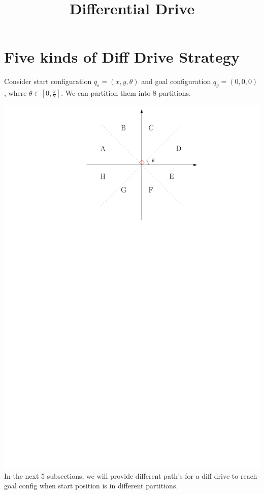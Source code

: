 \documentclass[12pt]{article}
\title{Differential Drive}
\date{}
\begin{document}
  \maketitle
  
  \section{Five kinds of Diff Drive Strategy}
  
  Consider start configuration $q_{s} = (x,y,\theta)$ and goal configuration $q_{g} = (0,0,0)$, where $\theta \in [0, \frac{\pi}{2}]$. We can partition them into 8 partitions.
  
  \includegraphics{Coordinate}\\
  
  In the next 5 subsections, we will provide different path's for a diff drive to reach goal config when start position is in different partitions. 
  
\end{document}

